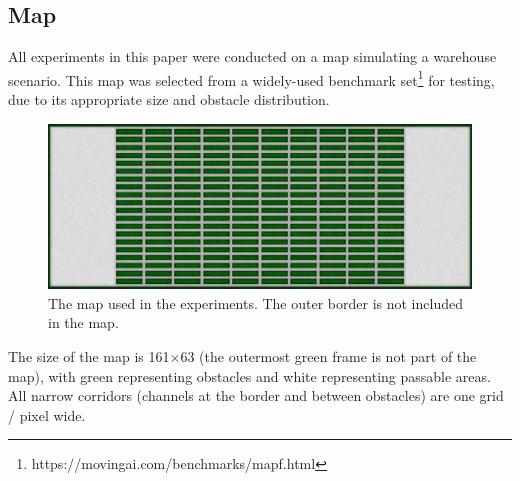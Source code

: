 \subsection*{Map}

All experiments in this paper were conducted on a map simulating a warehouse scenario.
This map was selected from a widely-used benchmark set\cite{stern2019mapf}\footnote{https://movingai.com/benchmarks/mapf.html} for testing, due to its appropriate size and obstacle distribution.

\begin{figure}[htbp]
    \centering
    \includegraphics*[width = \linewidth]{figures/map(color).png}
    \caption{The map used in the experiments. The outer border is not included in the map.}
    \label{fig:Map}
\end{figure}

The size of the map is 161$\times$63 (the outermost green frame is not part of the map), 
with green representing obstacles and white representing passable areas.
All narrow corridors (channels at the border and between obstacles) are one grid / pixel wide.

